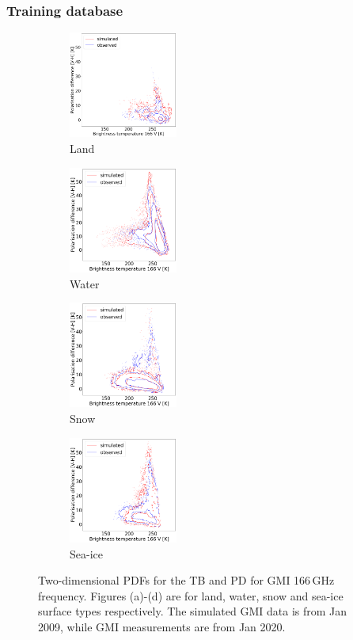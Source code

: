\documentclass[12pt,oneside,a4paper]{article}
\begin{document}
\subsubsection{Training database}
%
\begin{figure}[t]
	\centering
	\begin{subfigure}{.24\textwidth}
		\caption{Land}
		\includegraphics[height =35mm]{Figures/hist2d_gmi_45-60_land.png}
	\end{subfigure}
	\begin{subfigure}{.24\textwidth}
		\caption{Water}
		\includegraphics[height = 35mm]{Figures/hist2d_gmi_45-60_sea.png}
	\end{subfigure}
	\begin{subfigure}{.24\textwidth}
	\caption{Snow}
	\includegraphics[height = 35mm]{Figures/hist2d_gmi_45-60_snow.png}
\end{subfigure}
\begin{subfigure}{.24\textwidth}
	\caption{ Sea-ice}
	\includegraphics[height = 35mm]{Figures/hist2d_gmi_highlat_sea-ice.png}
\end{subfigure}
	\caption{Two-dimensional PDFs for the TB and PD for GMI 166\,GHz frequency. Figures (a)-(d) are for land, water, snow and sea-ice surface types respectively. The simulated GMI data is from Jan 2009, while GMI measurements are from Jan 2020.}
	\label{fig:histogram_2d}
\end{figure}
\end{document}
